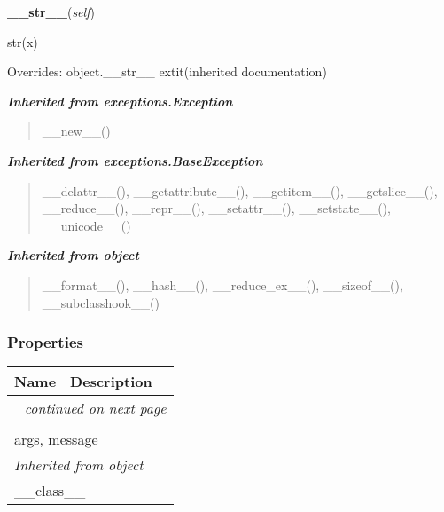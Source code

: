     \vspace{0.5ex}

\hspace{.8\funcindent}\begin{boxedminipage}{\funcwidth}

    \raggedright \textbf{\_\_str\_\_}(\textit{self})

\setlength{\parskip}{2ex}
    str(x)

\setlength{\parskip}{1ex}
      Overrides: object.\_\_str\_\_ 	extit{(inherited documentation)}

    \end{boxedminipage}


\large{\textbf{\textit{Inherited from exceptions.Exception}}}

\begin{quote}
\_\_new\_\_()
\end{quote}

\large{\textbf{\textit{Inherited from exceptions.BaseException}}}

\begin{quote}
\_\_delattr\_\_(), \_\_getattribute\_\_(), \_\_getitem\_\_(), \_\_getslice\_\_(), \_\_reduce\_\_(), \_\_repr\_\_(), \_\_setattr\_\_(), \_\_setstate\_\_(), \_\_unicode\_\_()
\end{quote}

\large{\textbf{\textit{Inherited from object}}}

\begin{quote}
\_\_format\_\_(), \_\_hash\_\_(), \_\_reduce\_ex\_\_(), \_\_sizeof\_\_(), \_\_subclasshook\_\_()
\end{quote}


  \subsubsection{Properties}

    \vspace{-1cm}
\hspace{\varindent}\begin{longtable}{|p{\varnamewidth}|p{\vardescrwidth}|l}
\cline{1-2}
\cline{1-2} \centering \textbf{Name} & \centering \textbf{Description}& \\
\cline{1-2}
\endhead\cline{1-2}\multicolumn{3}{r}{\small\textit{continued on next page}}\\\endfoot\cline{1-2}
\endlastfoot\multicolumn{2}{|l|}{\textit{Inherited from exceptions.BaseException}}\\
\multicolumn{2}{|p{\varwidth}|}{\raggedright args, message}\\
\cline{1-2}
\multicolumn{2}{|l|}{\textit{Inherited from object}}\\
\multicolumn{2}{|p{\varwidth}|}{\raggedright \_\_class\_\_}\\
\cline{1-2}
\end{longtable}

